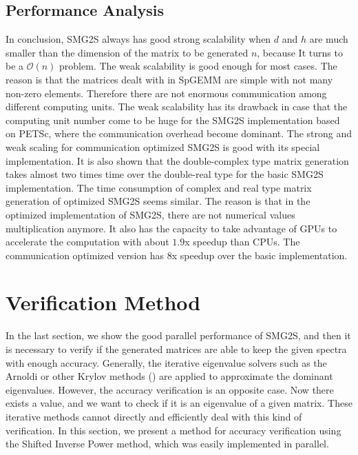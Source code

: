 \subsection{Performance Analysis}

In conclusion, SMG2S always has good strong scalability when $d$ and $h$ are much smaller than the dimension of the matrix to be generated $n$, because It turns to be a $\mathcal{O}(n)$ problem. The weak scalability is good enough for most cases. The reason is that the matrices dealt with in SpGEMM are simple with not many non-zero elements. Therefore there are not enormous communication among different computing units. The weak scalability has its drawback in case that the computing unit number come to be huge for the SMG2S implementation based on PETSc, where the communication overhead become dominant. The strong and weak scaling for communication optimized SMG2S is good with its special implementation. It is also shown that the double-complex type matrix generation takes almost two times time over the double-real type for the basic SMG2S implementation. The time consumption of complex and real type matrix generation of optimized SMG2S seems similar. The reason is that in the optimized implementation of SMG2S, there are not numerical values multiplication anymore.  It also has the capacity to take advantage of GPUs to accelerate the computation with about $1.9$x speedup than CPUs. The communication optimized version has $8$x speedup over the basic implementation.

\section{Verification Method}\label{Verification Method}

In the last section, we show the good parallel performance of SMG2S, and then it is necessary to verify if the generated matrices are able to keep the given spectra with enough accuracy. Generally, the iterative eigenvalue solvers such as the Arnoldi or other Krylov methods (\cite{petiton1992parallel}) are applied to approximate the dominant eigenvalues. However, the accuracy verification is an opposite case. Now there exists a value, and we want to check if it is an eigenvalue of a given matrix. These iterative methods cannot directly and efficiently deal with this kind of verification. In this section, we present a method for accuracy verification using the Shifted Inverse Power method, which was easily implemented in parallel.

